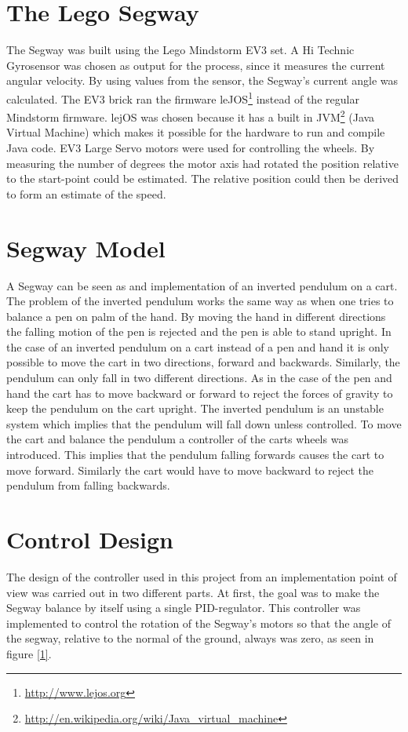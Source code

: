  \section{The Lego Segway}
 The Segway was built using the Lego Mindstorm EV3 set. A Hi Technic Gyrosensor was chosen as output for the process, since it measures the current angular velocity. By using values from the sensor, the Segway's current angle was calculated. The EV3 brick ran the firmware leJOS\footnote{\url{http://www.lejos.org}} instead of the regular Mindstorm firmware. lejOS was chosen because it has a built in JVM\footnote{\url{http://en.wikipedia.org/wiki/Java_virtual_machine}} (Java Virtual Machine) which makes it possible for the hardware to run and compile Java code. EV3 Large Servo motors were used for controlling the wheels. By measuring the number of degrees the motor axis had rotated the position relative to the start-point could be estimated. The relative position could then be derived to form an estimate of the speed. 

\section{Segway Model}
A Segway can be seen as and implementation of an inverted pendulum on a cart. The problem of the inverted pendulum works the same way as when one tries to balance a pen on palm of the hand. By moving the hand in different directions the falling motion of the pen is rejected and the pen is able to stand upright. In the case of an inverted pendulum on a cart instead of a pen and hand it is only possible to move the cart in two directions, forward and backwards. Similarly, the pendulum can only fall in two different directions. As in the case of the pen and hand the cart has to move backward or forward to reject the forces of gravity to keep the pendulum on the cart upright. The inverted pendulum is an unstable system which implies that the pendulum  will fall down unless controlled. To move the cart and balance the pendulum a controller of the carts wheels was introduced. This implies that the pendulum falling forwards causes the cart to move forward. Similarly the cart would have to move backward to reject the pendulum from falling backwards.


\section{Control Design}
The design of the controller used in this project from an implementation point of view was carried out in two different parts. 
At first, the goal was to make the Segway balance by itself using a single PID-regulator. This controller was implemented to control the rotation of the Segway's motors so that the angle of the segway, relative to the normal of the ground, always was zero, as seen in figure \ref{1}.

